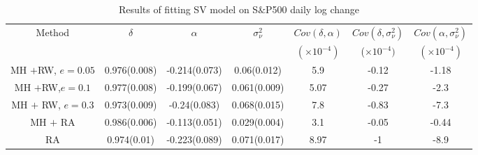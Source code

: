 \documentclass{article}
\begin{document}
\begin{table}
\centering
\begin{tabular}{|c|c|c|c|c|c|c|}
\hline
Method& $\delta$ & $\alpha$& $\sigma_\nu^2$& $Cov(\delta,\alpha)$& $Cov(\delta,\sigma_\nu^2)$&$Cov(\alpha,\sigma_\nu^2)$  \\
&&&&$(\times 10^{-4})$&($\times 10^{-4})$&$(\times 10^{-4})$\\
\hline
MH $+$RW, $e=0.05$ & 0.976(0.008) & -0.214(0.073) & 0.06(0.012) &5.9&-0.12& -1.18 \\
\hline
MH $+$RW,$e=0.1$& 0.977(0.008) &  -0.199(0.067) & 0.061(0.009)&5.07&-0.27&-2.3\\
\hline
MH $+$ RW, $e=0.3$ & 0.973(0.009) & -0.24(0.083) & 0.068(0.015)&7.8&-0.83&-7.3\\
\hline
MH $+$ RA &  0.986(0.006) & -0.113(0.051) & 0.029(0.004)&3.1&-0.05&-0.44\\
\hline
RA& 0.974(0.01) & -0.223(0.089) & 0.071(0.017)&8.97&-1&-8.9\\
\hline
\end{tabular}
\caption{Results of fitting SV model on S$\&$P500 daily log change}\label{2}
\end{table}
\end{document}
